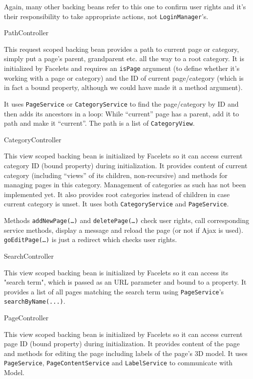 Again, many other backing beans refer to this one to confirm user rights and it’s their responsibility to take appropriate actions, not {\tt LoginManager}’s.

\secc PathController

This request scoped backing bean provides a path to current page or category, simply put a page’s parent, grandparent etc. all the way to a root category. It is initialized by Facelets and requires an {\tt isPage} argument (to define whether it’s working with a page or category) and the ID of current page/category (which is in fact a bound property, although we could have made it a method argument).

It uses {\tt PageService} or {\tt CategoryService} to find the page/category by ID and then adds its ancestors in a loop: While “current” page has a parent, add it to path and make it “current”. The path is a list of {\tt CategoryView}.

\secc CategoryController

This view scoped backing bean is initialized by Facelets so it can access current category ID (bound property) during initialization. It provides content of current category (including “views” of its children, non-recursive) and methods for managing pages in this category. Management of categories as such has not been implemented yet. It also provides root categories instead of children in case current category is unset. It uses both {\tt CategoryService} and {\tt PageService}.

Methods {\tt addNewPage(…)} and {\tt deletePage(…)} check user rights, call corresponding service methods, display a message and reload the page (or not if Ajax is used). {\tt goEditPage(…)} is just a redirect which checks user rights.

\secc SearchController

This view scoped backing bean is initialized by Facelets so it can access its "search term", which is passed as an URL parameter and bound to a property. It provides a list of all pages matching the search term using {\tt PageService}'s {\tt searchByName(...)}.

\secc PageController

This view scoped backing bean is initialized by Facelets so it can access current page ID (bound property) during initialization. It provides content of the page and methods for editing the page including labels of the page’s 3D model. It uses {\tt PageService}, {\tt PageContentService} and {\tt LabelService} to communicate with Model.

